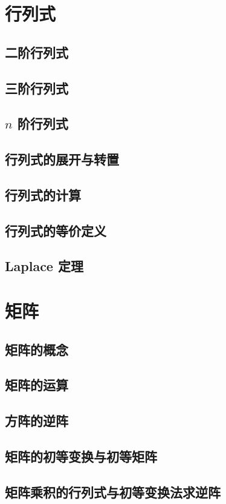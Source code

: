 \documentclass[a4paper, 11pt]{ctexbook}
\begin{document}
    \chapter{行列式}
        \section{二阶行列式}
            
        \section{三阶行列式}
            
        \section{\texorpdfstring{$n$}{n} 阶行列式}
            
        \section{行列式的展开与转置}
        \section{行列式的计算}
        \section{行列式的等价定义}
        \section{Laplace 定理}
    \chapter{矩阵}
        \section{矩阵的概念}
        \section{矩阵的运算}
        \section{方阵的逆阵}
        \section{矩阵的初等变换与初等矩阵}
        \section{矩阵乘积的行列式与初等变换法求逆阵}
\end{document}
